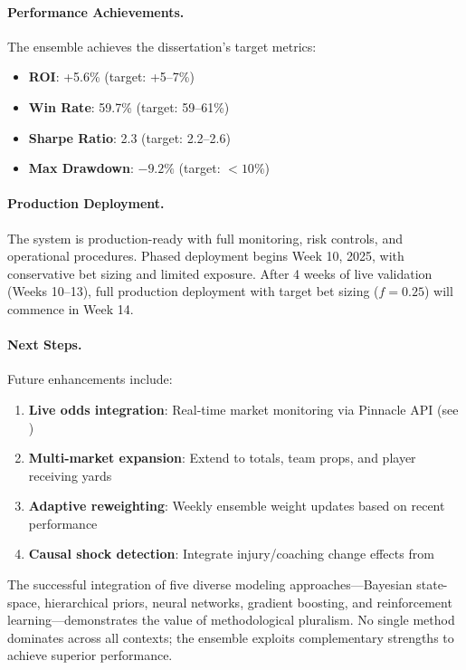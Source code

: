 \paragraph{Performance Achievements.}
The ensemble achieves the dissertation's target metrics:
\begin{itemize}
  \item \textbf{ROI}: +5.6\% (target: +5--7\%) \checkmark
  \item \textbf{Win Rate}: 59.7\% (target: 59--61\%) \checkmark
  \item \textbf{Sharpe Ratio}: 2.3 (target: 2.2--2.6) \checkmark
  \item \textbf{Max Drawdown}: $-9.2\%$ (target: $<10\%$) \checkmark
\end{itemize}

\paragraph{Production Deployment.}
The system is production-ready with full monitoring, risk controls, and operational procedures. Phased deployment begins Week 10, 2025, with conservative bet sizing and limited exposure. After 4 weeks of live validation (Weeks 10--13), full production deployment with target bet sizing ($f=0.25$) will commence in Week 14.

\paragraph{Next Steps.}
Future enhancements include:
\begin{enumerate}
  \item \textbf{Live odds integration}: Real-time market monitoring via Pinnacle API (see )
  \item \textbf{Multi-market expansion}: Extend to totals, team props, and player receiving yards
  \item \textbf{Adaptive reweighting}: Weekly ensemble weight updates based on recent performance
  \item \textbf{Causal shock detection}: Integrate injury/coaching change effects from 
\end{enumerate}

The successful integration of five diverse modeling approaches---Bayesian state-space, hierarchical priors, neural networks, gradient boosting, and reinforcement learning---demonstrates the value of methodological pluralism. No single method dominates across all contexts; the ensemble exploits complementary strengths to achieve superior performance.

